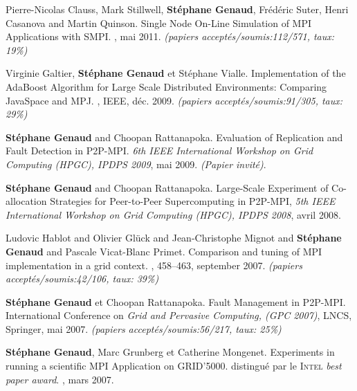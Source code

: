\documentclass[11pt]{article}
\newcommand{\pmpi}{\mbox{\textsc{P2P-MPI}}}
\begin{document}
\begin{thebibliography}{99}
\newblock Pierre-Nicolas Clauss, Mark Stillwell, \textbf{Stéphane Genaud}, 
Fr\'ed\'eric Suter, Henri Casanova and  Martin Quinson.
\newblock Single Node On-Line Simulation of MPI Applications with SMPI.
, mai 2011.
\newblock \small{\textit{(papiers acceptés/soumis{:}112/571, taux: 19\%)}}

\newblock Virginie Galtier, \textbf{Stéphane Genaud} et Stéphane Vialle.
\newblock Implementation of the AdaBoost Algorithm for Large Scale Distributed 
Environments: Comparing JavaSpace and MPJ.
, 
IEEE, déc. 2009.
\newblock \small{\textit{(papiers acceptés/soumis:91/305, taux: 29\%)}}


\textbf{Stéphane Genaud} and Choopan Rattanapoka.
\newblock Evaluation of Replication and Fault Detection in P2P-MPI.
\newblock 
{\em 6th IEEE International Workshop on Grid Computing (HPGC), IPDPS 2009}, 
mai 2009.
\newblock \textit{(Papier invité)}.

\textbf{Stéphane Genaud} and Choopan Rattanapoka. 
\newblock Large-Scale Experiment of Co-allocation Strategies for Peer-to-Peer 
Supercomputing in P2P-MPI,
\newblock 
{\em 5th IEEE International Workshop on Grid Computing (HPGC), IPDPS 2008}, 
avril 2008.

Ludovic Hablot and Olivier Glück and Jean-Christophe Mignot and \textbf{Stéphane Genaud} and Pascale Vicat-Blanc Primet.
\newblock Comparison and tuning of MPI implementation in a grid context.
, 458--463, september 2007.
\newblock \small{\textit{(papiers acceptés/soumis:42/106, taux: 39\%)}}

\newblock \textbf{Stéphane Genaud} et Choopan Rattanapoka.
\newblock Fault Management in {\pmpi}. 
\newblock International Conference on {\em Grid and Pervasive Computing, 
(GPC 2007)}, LNCS, Springer, mai 2007.
\newblock \small{\textit{(papiers acceptés/soumis:56/217, taux: 25\%)}}

\newblock \textbf{Stéphane Genaud}, Marc Grunberg et Catherine Mongenet.
\newblock Experiments in running a scientific {MPI} Application on GRID'5000. 
\newblock distingué par le \textsc{Intel} \textit{best paper award}.
, mars 2007.



\end{thebibliography}
\end{document}
